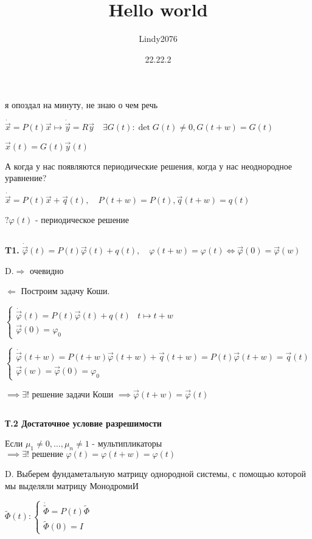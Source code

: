 \documentclass[12pt, a4paper]{article}
\title{Hello world}
\author{Lindy2076}
\date{22.22.2} %
\begin{document}
    я опоздал на минуту, не знаю о чем речь

    $\dot{\vec{x}} = P(t)\vec{x} \mapsto \dot{\vec{y}} = R\vec{y} \quad \exists G(t) : \det G(t) \neq 0, G(t+w) = G(t)$

    $\vec{x}(t) = G(t)\vec{y}(t)$

    А когда у нас появляются периодические решения, когда у нас неоднородное уравнение?

    $\dot{\vec{x}} = P(t)\vec{x} + \vec{q}(t), \quad P(t+w) = P(t), \vec{q}(t+w) = q(t)$

    $? \varphi(t)$ - периодическое решение
    
    \par $ $

    \textbf{T1.} $\dot{\vec{\varphi}}(t) = P(t)\vec{\varphi}(t) + q(t),\quad \varphi(t+w) = \varphi(t) \iff \vec\varphi(0) = \vec{\varphi}(w)$

    D.$\Rightarrow$ очевидно

    $\Leftarrow$ Построим задачу Коши.

    $\begin{cases}
        \dot{\vec{\varphi}}(t) = P(t) \vec{\varphi}(t) + q(t) &t \mapsto t+w\\
        \vec{\varphi}(0) = \varphi_0
    \end{cases}$

    $\begin{cases}
        \dot{\vec{\varphi}}(t+w) = P(t+w)\vec{\varphi}(t+w) + \vec{q}(t+w) = P(t)\vec{\varphi}(t+w) = \vec{q}(t)\\
        \vec{\varphi}(w) = \vec{\varphi}(0) = \varphi_0
    \end{cases}$

    $\implies \exists!$ решение задачи Коши $\implies \vec{\varphi}(t+w) = \vec{\varphi}(t)$

    \par $ $
    
    \textbf{Т.2 Достаточное условие разрешимости}

    Если $\mu_1\neq 0, \dotsc, \mu_n \neq 1$ - мультипликаторы $\implies \exists! 
    \text{ решение } \varphi(t) = \varphi(t+w)=\varphi(t)$

    D. Выберем фундаметальную матрицу однородной системы, с помощью которой мы выделяли матрицу МонодромиИ

    $\widetilde{\Phi}(t): \begin{cases}
        \dot{\widetilde{\Phi}} = P(t)\widetilde{\Phi} \\
        \widetilde{\Phi}(0) = I
    \end{cases}$
\end{document}
